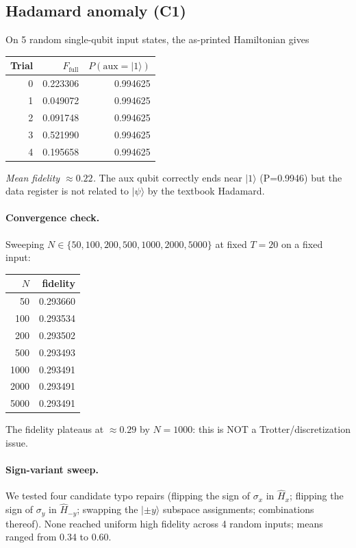 \documentclass[11pt]{article}
\begin{document}
\subsection{Hadamard anomaly (C1)}
On 5 random single-qubit input states, the as-printed Hamiltonian gives
\begin{center}
\begin{tabular}{@{}rrr@{}}
\toprule
Trial & $F_\text{full}$ & $P(\text{aux}=|1\rangle)$ \\
\midrule
0 & 0.223306 & 0.994625 \\
1 & 0.049072 & 0.994625 \\
2 & 0.091748 & 0.994625 \\
3 & 0.521990 & 0.994625 \\
4 & 0.195658 & 0.994625 \\
\bottomrule
\end{tabular}
\end{center}
\emph{Mean fidelity $\approx 0.22$.} The aux qubit correctly ends near $|1\rangle$ (P=0.9946) but the data register is not related to $|\psi\rangle$ by the textbook Hadamard.

\paragraph{Convergence check.} Sweeping $N \in \{50,100,200,500,1000,2000,5000\}$ at fixed $T=20$ on a fixed input:
\begin{center}
\begin{tabular}{@{}rr@{}}
\toprule
$N$ & fidelity \\
\midrule
50   & 0.293660 \\
100  & 0.293534 \\
200  & 0.293502 \\
500  & 0.293493 \\
1000 & 0.293491 \\
2000 & 0.293491 \\
5000 & 0.293491 \\
\bottomrule
\end{tabular}
\end{center}
The fidelity plateaus at $\approx 0.29$ by $N=1000$: this is NOT a Trotter/discretization issue.

\paragraph{Sign-variant sweep.} We tested four candidate typo repairs (flipping the sign of $\sigma_x$ in $\hat H_x$; flipping the sign of $\sigma_y$ in $\hat H_{-y}$; swapping the $|\pm y\rangle$ subspace assignments; combinations thereof). None reached uniform high fidelity across 4 random inputs; means ranged from 0.34 to 0.60.
\end{document}

